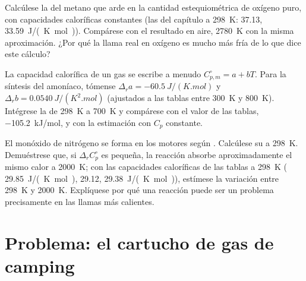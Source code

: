 \begin{exercise}[$\star\star\star$]\label{exo:b2:reaction-enthalpy:10}
Calcúlese la  del metano que arde en la
cantidad estequiométrica de oxígeno puro, con capacidades caloríficas constantes (las
del capítulo a \qty{298}{K}:  37.13, 
\qty{33.59}{J/(K.mol)}). Compárese con el resultado en aire,
\qty{2780}{K} con la misma aproximación. ¿Por qué la llama real en oxígeno es
mucho más fría de lo que dice este cálculo?
\end{exercise}

\begin{exercise}[$\star\star\star$]\label{exo:b2:reaction-enthalpy:11}
La capacidad calorífica de un gas se escribe a menudo $C_{p,m}^\circ = a + bT$. Para
la síntesis del amoníaco, tómense $\Delta_r a = \qty{-60.5}{J/(K.mol)}$ y
$\Delta_r b = \qty{0.0540}{J/(K^2.mol)}$ (ajustados a las tablas entre
\qty{300}{K} y \qty{800}{K}). Intégrese la  de
\qty{298}{K} a \qty{700}{K} y compárese con el valor de las tablas,
\qty{-105.2}{kJ/mol}, y con la estimación con $C_p$ constante.
\end{exercise}

\begin{exercise}[$\star\star\star$]\label{exo:b2:reaction-enthalpy:12}
El monóxido de nitrógeno se forma en los motores según .
Calcúlese su  a \qty{298}{K}. Demuéstrese que, si
$\Delta_r C_p^\circ$ es pequeña, la reacción absorbe aproximadamente el mismo calor a
\qty{2000}{K}; con las capacidades caloríficas de las tablas a \qty{298}{K}
( \qty{29.85}{J/(K.mol)},  29.12, 
\qty{29.38}{J/(K.mol)}), estímese la variación entre
\qty{298}{K} y \qty{2000}{K}. Explíquese por qué una reacción  puede
ser un problema precisamente en las llamas más calientes.
\end{exercise}

\section{Problema: el cartucho de gas de camping}


